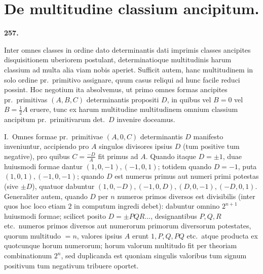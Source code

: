 \documentclass[12pt,a4paper]{article}
\theoremstyle{plain}
\theoremstyle{definition}
\theoremstyle{remark}
\begin{document}
\newpage
\section*{De multitudine classium ancipitum.}

\begin{center}\textbf{257.}\end{center}

Inter omnes classes in ordine dato determinantis dati imprimis classes ancipites disquisitionem uberiorem postulant, determinatioque multitudinis harum classium ad multa alia viam nobis aperiet. Sufficit autem, hanc multitudinem in solo ordine pr.\ primitivo assignare, quum casus reliqui ad hunc facile reduci possint. Hoc negotium ita absolvemus, ut primo omnes formas ancipites pr.\ primitivas $(A, B, C)$ determinantis propositi $D$, in quibus vel $B = 0$ vel $B = \tfrac{1}{2}A$ eruere, tunc ex harum multitudine multitudinem omnium classium ancipitum pr.\ primitivarum det.\ $D$ invenire doceamus.

I.\ Omnes formae pr.\ primitivae $(A, 0, C)$ determinantis $D$ manifesto inveniuntur, accipiendo pro $A$ singulos divisores ipsius $D$ (tum positive tum negative), pro quibus $C = \tfrac{-D}{A}$ fit primus ad $A$. Quando itaque $D = \pm 1$, duae huiusmodi formae dantur $(1, 0, -1), (-1, 0, 1)$; totidem quando $D = -1$, puta $(1, 0, 1), (-1, 0, -1)$; quando $D$ est numerus primus aut numeri primi potestas (sive $\pm D$), quatuor dabuntur $(1, 0, -D), (-1, 0, D), (D, 0, -1), (-D, 0, 1)$. Generaliter autem, quando $D$ per $n$ numeros primos diversos est divisibilis (inter quos hoc loco etiam $2$ in computum ingredi debet): dabuntur omnino $2^{n+1}$ huiusmodi formae; scilicet posito $D = \pm PQR\ldots$, designantibus $P, Q, R$ etc.\ numeros primos diversos aut numerorum primorum diversorum potestates, quorum multitudo $= n$, valores ipsius $A$ erunt $1, P, Q, PQ$ etc.\ atque producta ex quotcunque horum numerorum; horum valorum multitudo fit per theoriam combinationum $2^{n}$, sed duplicanda est quoniam singulis valoribus tum signum positivum tum negativum tribuere oportet.
\end{document}
